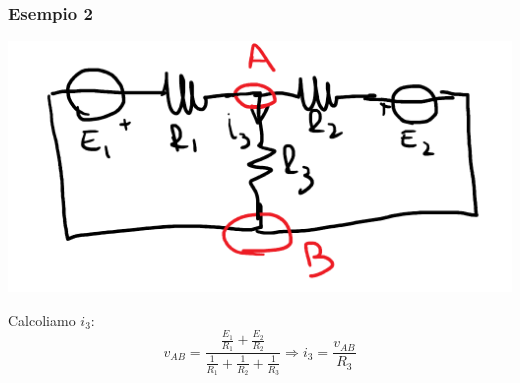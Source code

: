 \documentclass{article}
\begin{document}
\subsubsection{Esempio 2}
\begin{center}
    \includegraphics[scale=0.3]{Image/Es_Millman_2.png}
\end{center}
Calcoliamo $i_3$:
\[
    v_{AB} = \frac{\frac{E_1}{R_1}+\frac{E_2}{R_2}}{\frac{1}{R_1}+\frac{1}{R_2}+\frac{1}{R_3}} \Rightarrow i_3 = \frac{v_{AB}}{R_3}
\]
\end{document}
